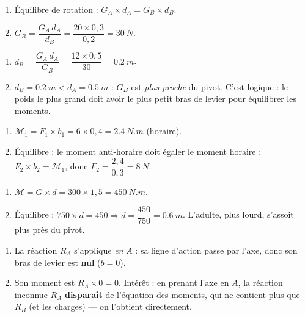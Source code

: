 \documentclass[11pt,a4paper]{article}
\begin{document}
\begin{corrige}
\begin{enumerate}[label=\alph*)]
  \item Équilibre de rotation : $G_A\times d_A = G_B\times d_B$.
  \item $G_B = \dfrac{G_A\, d_A}{d_B} = \dfrac{20\times 0{,}3}{0{,}2} = \qty{30}{N}$.
\end{enumerate}
\end{corrige}

\begin{corrige}
\begin{enumerate}[label=\alph*)]
  \item $d_B = \dfrac{G_A\, d_A}{G_B} = \dfrac{12\times 0{,}5}{30} = \qty{0.2}{m}$.
  \item $d_B=\qty{0.2}{m} < d_A=\qty{0.5}{m}$ : $G_B$ est \emph{plus proche} du pivot. C'est logique :
        le poids le plus grand doit avoir le plus petit bras de levier pour équilibrer les moments.
\end{enumerate}
\end{corrige}

\begin{corrige}
\begin{enumerate}[label=\alph*)]
  \item $\mathcal{M}_1 = F_1\times b_1 = 6\times 0{,}4 = \qty{2.4}{N.m}$ (horaire).
  \item Équilibre : le moment anti-horaire doit égaler le moment horaire :
        $F_2\times b_2 = \mathcal{M}_1$, donc $F_2 = \dfrac{2{,}4}{0{,}3} = \qty{8}{N}$.
\end{enumerate}
\end{corrige}

\begin{corrige}[la balançoire]
\begin{enumerate}[label=\alph*)]
  \item $\mathcal{M} = G\times d = 300\times 1{,}5 = \qty{450}{N.m}$.
  \item Équilibre : $750\times d = 450 \Rightarrow d = \dfrac{450}{750} = \qty{0.6}{m}$. L'adulte, plus
        lourd, s'assoit plus près du pivot.
\end{enumerate}
\end{corrige}

\begin{corrige}
\begin{enumerate}[label=\alph*)]
  \item La réaction $R_A$ s'applique \emph{en} $A$ : sa ligne d'action passe par l'axe, donc son bras de
        levier est \textbf{nul} ($b=0$).
  \item Son moment est $R_A\times 0 = 0$. Intérêt : en prenant l'axe en $A$, la réaction inconnue $R_A$
        \textbf{disparaît} de l'équation des moments, qui ne contient plus que $R_B$ (et les charges) —
        on l'obtient directement.
\end{enumerate}
\end{corrige}
\end{document}

